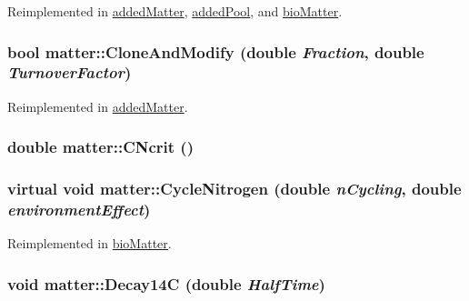 Reimplemented in \hyperlink{classadded_matter_ad211e0c8e46f87b030a5101560f0c6a0}{addedMatter}, \hyperlink{classadded_pool_a6841609f3de8ac7a775bbd915eeaefdb}{addedPool}, and \hyperlink{classbio_matter_ab60f7bac01ff6e5de8c0be13d28c91b5}{bioMatter}.\hypertarget{classmatter_a2c91964d566a29807648e62548c6b159}{
\subsubsection[{CloneAndModify}]{\setlength{\rightskip}{0pt plus 5cm}bool matter::CloneAndModify (double {\em Fraction}, \/  double {\em TurnoverFactor})}}
\label{classmatter_a2c91964d566a29807648e62548c6b159}


Reimplemented in \hyperlink{classadded_matter_a8032c019960cff02dc5cb38ef2c2614e}{addedMatter}.\hypertarget{classmatter_af3b6b437f85e529623fdb3a93adbe4ad}{
\subsubsection[{CNcrit}]{\setlength{\rightskip}{0pt plus 5cm}double matter::CNcrit ()}}
\label{classmatter_af3b6b437f85e529623fdb3a93adbe4ad}
\hypertarget{classmatter_a2c4adc457cfb867ea5abd7e8a3489c48}{
\subsubsection[{CycleNitrogen}]{\setlength{\rightskip}{0pt plus 5cm}virtual void matter::CycleNitrogen (double {\em nCycling}, \/  double {\em environmentEffect})}}
\label{classmatter_a2c4adc457cfb867ea5abd7e8a3489c48}


Reimplemented in \hyperlink{classbio_matter_a9257d95bfb49081c8dc1f2515f1a9d13}{bioMatter}.\hypertarget{classmatter_aa5d1ab3edc35b1ade3f0714af81e3ab1}{
\subsubsection[{Decay14C}]{\setlength{\rightskip}{0pt plus 5cm}void matter::Decay14C (double {\em HalfTime})}}
\label{classmatter_aa5d1ab3edc35b1ade3f0714af81e3ab1}


